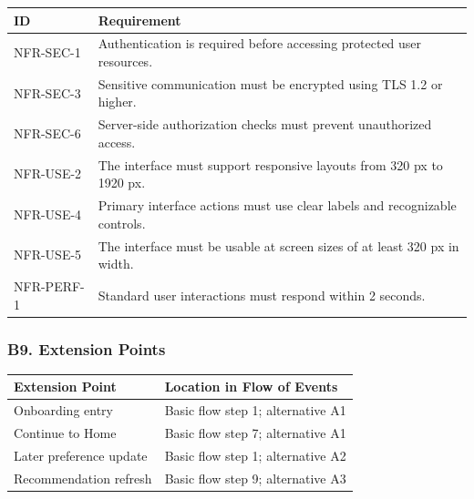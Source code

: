 \documentclass[12pt]{article}
\renewcommand{\baselinestretch}{1.5}
\begin{document}
\begingroup
\small
\renewcommand{\baselinestretch}{1.0}\selectfont
\renewcommand{\arraystretch}{1.15}
\setlength{\tabcolsep}{6pt}
\begin{longtable}{|>{\raggedright\arraybackslash}p{}|>{\raggedright\arraybackslash}p{}|}
\hline
\textbf{ID} & \textbf{Requirement} \\ \hline
\endhead
NFR-SEC-1 & Authentication is required before accessing protected user resources. \\ \hline
NFR-SEC-3 & Sensitive communication must be encrypted using TLS 1.2 or higher. \\ \hline
NFR-SEC-6 & Server-side authorization checks must prevent unauthorized access. \\ \hline
NFR-USE-2 & The interface must support responsive layouts from 320 px to 1920 px. \\ \hline
NFR-USE-4 & Primary interface actions must use clear labels and recognizable controls. \\ \hline
NFR-USE-5 & The interface must be usable at screen sizes of at least 320 px in width. \\ \hline
NFR-PERF-1 & Standard user interactions must respond within 2 seconds. \\ \hline
\end{longtable}
\endgroup
\par\medskip

\hypertarget{sec:b9-extension-points}{}
\subsubsection*{B9. Extension Points}
\par\medskip

\begingroup
\small
\renewcommand{\baselinestretch}{1.0}\selectfont
\renewcommand{\arraystretch}{1.15}
\setlength{\tabcolsep}{6pt}
\begin{longtable}{|>{\raggedright\arraybackslash}p{}|>{\raggedright\arraybackslash}p{}|}
\hline
\textbf{Extension Point} & \textbf{Location in Flow of Events} \\ \hline
\endhead
Onboarding entry & Basic flow step 1; alternative A1 \\ \hline
Continue to Home & Basic flow step 7; alternative A1 \\ \hline
Later preference update & Basic flow step 1; alternative A2 \\ \hline
Recommendation refresh & Basic flow step 9; alternative A3 \\ \hline
\end{longtable}
\endgroup
\par\medskip
\end{document}
